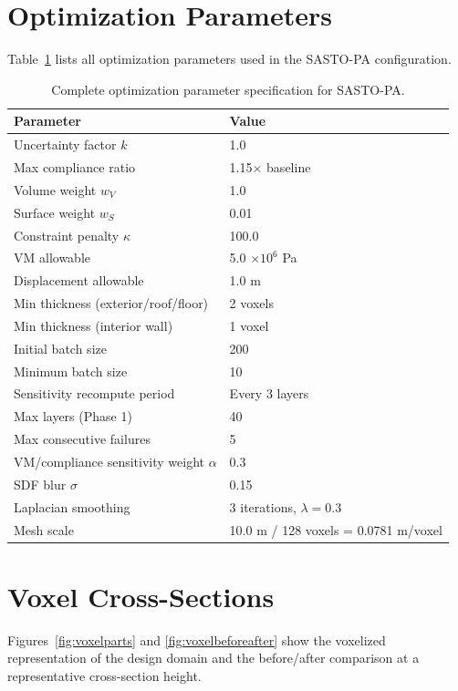 \documentclass[11pt]{article}
\theoremstyle{plain}
\theoremstyle{definition}
\theoremstyle{remark}
\begin{document}
\section{Optimization Parameters}
\label{app:optparams}

Table~\ref{tab:optparams} lists all optimization parameters used in the SASTO-PA configuration.

\begin{table}[h]
\centering
\caption{Complete optimization parameter specification for SASTO-PA.}
\label{tab:optparams}
\small
\begin{tabular}{@{}ll@{}}
\toprule
\textbf{Parameter} & \textbf{Value} \\
\midrule
Uncertainty factor $k$ & 1.0 \\
Max compliance ratio & 1.15$\times$ baseline \\
Volume weight $w_V$ & 1.0 \\
Surface weight $w_S$ & 0.01 \\
Constraint penalty $\kappa$ & 100.0 \\
VM allowable & 5.0 $\times 10^6$ Pa \\
Displacement allowable & 1.0 m \\
Min thickness (exterior/roof/floor) & 2 voxels \\
Min thickness (interior wall) & 1 voxel \\
Initial batch size & 200 \\
Minimum batch size & 10 \\
Sensitivity recompute period & Every 3 layers \\
Max layers (Phase 1) & 40 \\
Max consecutive failures & 5 \\
VM/compliance sensitivity weight $\alpha$ & 0.3 \\
SDF blur $\sigma$ & 0.15 \\
Laplacian smoothing & 3 iterations, $\lambda = 0.3$ \\
Mesh scale & 10.0 m / 128 voxels = 0.0781 m/voxel \\
\bottomrule
\end{tabular}
\end{table}

\section{Voxel Cross-Sections}
\label{app:voxel}

Figures~\ref{fig:voxelparts} and \ref{fig:voxelbeforeafter} show the voxelized representation of the design domain and the before/after comparison at a representative cross-section height.
\end{document}
